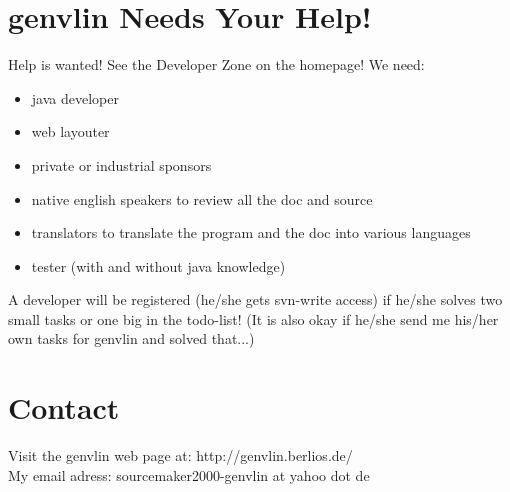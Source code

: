\documentclass[12pt]{article}
\begin{document}
\section{genvlin Needs Your Help!}
Help is wanted! See the Developer Zone on the homepage! We need:\\
\begin{itemize}
\item java developer
\item web layouter
\item private or industrial sponsors
\item native english speakers to review all the doc and source
\item translators to translate the program and the doc into various languages
\item tester (with and without java knowledge)
\end{itemize}
A developer will be registered (he/she gets svn-write access) if he/she solves two small tasks or one big in the todo-list! (It is also okay if he/she send me his/her own tasks for genvlin and solved that...)
\section{Contact}
\label{contact}
Visit the genvlin web page at: http://genvlin.berlios.de/\\
My email adress: sourcemaker2000-genvlin at yahoo dot de\\
\end{document}
